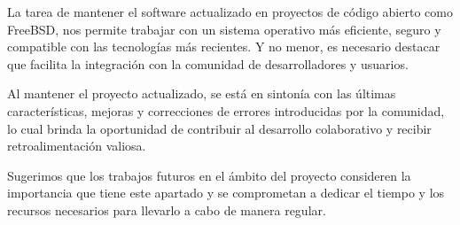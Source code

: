 La tarea de mantener el software actualizado en proyectos de código abierto como FreeBSD, nos permite trabajar con un sistema operativo más eficiente, seguro y compatible con las tecnologías más recientes. Y no menor, es necesario destacar que facilita la integración con la comunidad de desarrolladores y usuarios.\par

Al mantener el proyecto actualizado, se está en sintonía con las últimas características, mejoras y correcciones de errores introducidas por la comunidad, lo cual brinda la oportunidad de contribuir al desarrollo colaborativo y recibir retroalimentación valiosa.\par

Sugerimos que los trabajos futuros en el ámbito del proyecto consideren la importancia que tiene este apartado y se comprometan a dedicar el tiempo y los recursos necesarios para llevarlo a cabo de manera regular.\par
